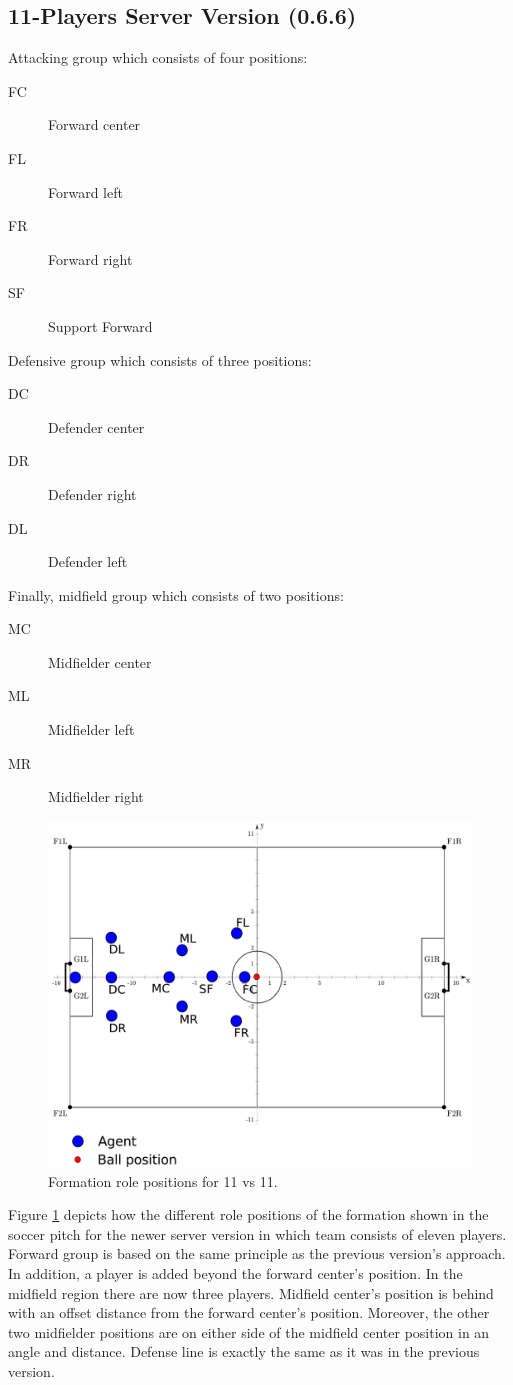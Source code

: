 \subsection{11-Players Server Version (0.6.6)}
Attacking group which consists of four positions:
\begin{description}
\item[FC] Forward center
\item[FL] Forward left
\item[FR] Forward right
\item[SF] Support Forward
\end{description}
Defensive group which consists of three positions:
\begin{description}
\item[DC] Defender center
\item[DR] Defender right 
\item[DL] Defender left
\end{description}
Finally, midfield group which consists of two positions:
\begin{description}
\item[MC] Midfielder center
\item[ML] Midfielder left
\item[MR] Midfielder right
\end{description}
\begin{figure}[htb!]
\centering
  \includegraphics[width=\textwidth]{Chapter4/figures/Formation11_0.pdf}
  \caption{Formation role positions for 11 vs 11.} 
  \label{fig:Formation11_0}
\end{figure}
Figure \ref{fig:Formation11_0} depicts how the different role positions of the formation shown in the soccer pitch for the newer server version in which team consists of eleven players. Forward group is based on the same principle as the previous version's approach. In addition, a player is added beyond the forward center's position. In the midfield region there are now three players. Midfield center's position is behind with an offset distance from the forward center's position. Moreover, the other two midfielder positions are on either side of the midfield center position in an angle and distance. Defense line is exactly the same as it was in the previous version.


